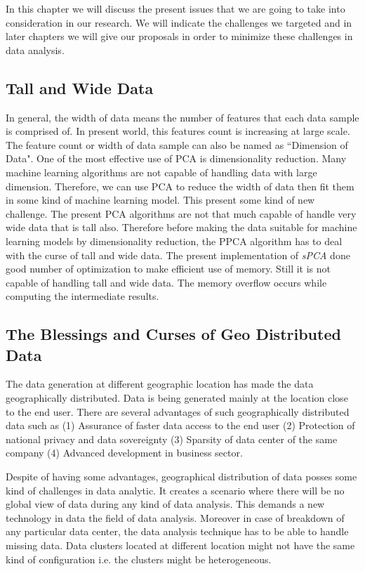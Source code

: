 \documentclass[10pt,conference,letterpaper]{IEEEtran}
\begin{document}
In this chapter we will discuss the present issues that we are going to take into consideration in our research. We will indicate the challenges we targeted and in later chapters we will give our proposals in order to minimize these challenges in data analysis.

\subsection{Tall and Wide Data}
In general, the width of data means the number of features that each data sample is comprised of. In present world, this features count is increasing at large scale. The feature count or width of data sample can also be named as ``Dimension of Data". One of the most effective use of PCA is dimensionality reduction. Many machine learning algorithms are not capable of handling data with large dimension. Therefore, we can use PCA to reduce the width of data then fit them in some kind of machine learning model. This present some kind of new challenge. The present PCA algorithms are not that much capable of handle very wide data that is tall also. Therefore before making the data suitable for machine learning models by dimensionality reduction, the PPCA algorithm has to deal with the curse of tall and wide data. The present implementation of \textit{sPCA} done good number of optimization to make efficient use of memory. Still it is not capable of handling tall and wide data. The memory overflow occurs while computing the intermediate results. 
\subsection{The Blessings and Curses of Geo Distributed Data}
The data generation at different geographic location has made the data geographically distributed. Data is being generated mainly at the location close to the end user. There are several advantages of such geographically distributed data such as (1) Assurance of faster data access to the end user (2) Protection of national privacy and data sovereignty (3) Sparsity of data center of the same company (4) Advanced development in business sector. 

Despite of having some advantages, geographical distribution of data posses some kind of challenges in data analytic. It creates a scenario where there will be no global view of data during any kind of data analysis. This demands a new technology in data the field of data analysis. Moreover in case of breakdown of any particular data center, the data analysis technique has to be able to handle missing data. Data clusters located at different location might not have the same kind of configuration i.e. the clusters might be heterogeneous. 
\end{document}
